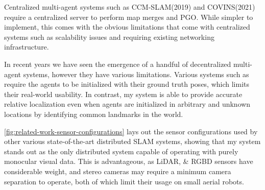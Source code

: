 Centralized multi-agent systems such as CCM-SLAM(2019) \autocite{schmuck2019ccm} and COVINS(2021) \autocite{schmuck2021covins} require a centralized server to perform map merges and PGO. While simpler to implement, this comes with the obvious limitations that come with centralized systems such as scalability issues and requiring existing networking infrastructure.

In recent years we have seen the emergence of a handful of decentralized multi-agent systems, however they have various limitations. Various systems such as \autocite{doi:10.1126/scirobotics.abm5954} \autocite{8658783} \autocite{DBLP:journals/corr/abs-2103-12770} require the agents to be initialized with their ground truth poses, which limits their real-world usability. In contrast, my system is able to provide accurate relative localization even when agents are initialized in arbitrary and unknown locations by identifying common landmarks in the world.

\autoref{fig:related-work-sensor-configurations} lays out the sensor configurations used by other various state-of-the-art distributed SLAM systems, showing that my system stands out as the only distributed system capable of operating with purely monocular visual data. This is advantageous, as LiDAR,  \& RGBD sensors have considerable weight, and stereo cameras may require a minimum camera separation to operate, both of which limit their usage on small aerial robots.

